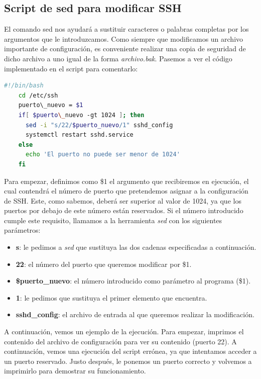 	\subsection{Script de sed para modificar SSH}
	El comando sed nos ayudará a sustituir caracteres o palabras completas por los argumentos que le introduzcamos. Como siempre que modificamos un archivo importante de configuración, es conveniente realizar una copia de seguridad de dicho archivo a uno igual de la forma \emph{archivo.bak}. Pasemos a ver el código implementado en el script para comentarlo:
	\begin{lstlisting}[language=bash]
	#!/bin/bash
	cd /etc/ssh
	puerto\_nuevo = $1
	if[ $puerto\_nuevo -gt 1024 ]; then
	  sed -i "s/22/$puerto_nuevo/1" sshd_config
	  systemctl restart sshd.service
	else
	  echo 'El puerto no puede ser menor de 1024'
	fi
	\end{lstlisting}
	Para empezar, definimos como \$1 el argumento que recibiremos en ejecución, el cual contendrá el número de puerto que pretendemos asignar a la configuración de SSH. Este, como sabemos, deberá ser superior al valor de 1024, ya que los puertos por debajo de este número están reservados.
	Si el número introducido cumple este requisito, llamamos a la herramienta \emph{sed} con los siguientes parámetros:
	\begin{itemize}
		\item \textbf{s}: le pedimos a \emph{sed} que sustituya las dos cadenas especificadas a continuación.
		\item \textbf{22}: el número del puerto que queremos modificar por \$1.
		\item \textbf{\$puerto\_nuevo}: el número introducido como parámetro al programa (\$1).
		\item \textbf{1}: le pedimos que sustituya el primer elemento que encuentra.
		\item \textbf{sshd\_config}: el archivo de entrada al que queremos realizar la modificación.
	\end{itemize}
	A continuación, vemos un ejemplo de la ejecución. Para empezar, imprimos el contenido del archivo de configuración para ver su contenido (puerto 22). A continuación, vemos una ejecución del script errónea, ya que intentamos acceder a un puerto reservado. Justo después, le ponemos un puerto correcto y volvemos a imprimirlo para demostrar su funcionamiento.
